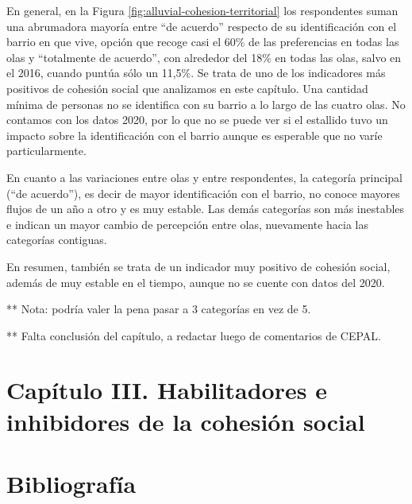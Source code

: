 \documentclass[
  12pt,
]{book}
\begin{document}
En general, en la Figura \ref{fig:alluvial-cohesion-territorial} los respondentes suman una abrumadora mayoría entre ``de acuerdo'' respecto de su identificación con el barrio en que vive, opción que recoge casi el 60\% de las preferencias en todas las olas y ``totalmente de acuerdo'', con alrededor del 18\% en todas las olas, salvo en el 2016, cuando puntúa sólo un 11,5\%. Se trata de uno de los indicadores más positivos de cohesión social que analizamos en este capítulo. Una cantidad mínima de personas no se identifica con su barrio a lo largo de las cuatro olas. No contamos con los datos 2020, por lo que no se puede ver si el estallido tuvo un impacto sobre la identificación con el barrio aunque es esperable que no varíe particularmente.

En cuanto a las variaciones entre olas y entre respondentes, la categoría principal (``de acuerdo''), es decir de mayor identificación con el barrio, no conoce mayores flujos de un año a otro y es muy estable. Las demás categorías son más inestables e indican un mayor cambio de percepción entre olas, nuevamente hacia las categorías contiguas.

En resumen, también se trata de un indicador muy positivo de cohesión social, además de muy estable en el tiempo, aunque no se cuente con datos del 2020.

** Nota: podría valer la pena pasar a 3 categorías en vez de 5.

** Falta conclusión del capítulo, a redactar luego de comentarios de CEPAL.

\hypertarget{capuxedtulo-iii.-habilitadores-e-inhibidores-de-la-cohesiuxf3n-social}{%
\chapter{Capítulo III. Habilitadores e inhibidores de la cohesión social}\label{capuxedtulo-iii.-habilitadores-e-inhibidores-de-la-cohesiuxf3n-social}}

\hypertarget{bibliografuxeda}{%
\chapter*{Bibliografía}\label{bibliografuxeda}}
\end{document}
